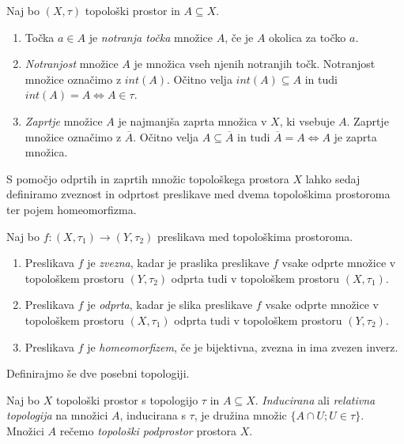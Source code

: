 \documentclass[mat1]{fmfdelo}
\newcommand{\closure}[1]{\overline{#1}}
\begin{document}
\begin{definicija}\label{def:notranjost}
Naj bo $(X, \tau)$ topološki prostor in $A \subseteq X$.
\begin{enumerate}
\item Točka $a \in A$ je \emph{notranja točka} množice $A$, če je $A$ okolica za točko $a$.
\item \emph{Notranjost} množice $A$ je množica vseh njenih notranjih točk. Notranjost množice označimo z $int(A)$. Očitno velja $int(A) \subseteq A$ in tudi $int(A) = A \iff A \in \tau$.
\item \emph{Zaprtje} množice $A$ je najmanjša zaprta množica v $X$, ki vsebuje $A$. Zaprtje množice označimo z $\closure{A}$. Očitno velja $A \subseteq \closure{A}$ in tudi $\closure{A} = A \iff A$ je zaprta množica.
\end{enumerate}
\end{definicija}

S pomočjo odprtih in zaprtih množic topološkega prostora $X$ lahko sedaj definiramo zveznost in odprtost preslikave med dvema topološkima prostoroma ter pojem homeomorfizma.

\begin{definicija}\label{def:toppreslikave}
Naj bo $f: (X, \tau_1) \to (Y, \tau_2)$ preslikava med topološkima prostoroma.
\begin{enumerate}
\item Preslikava $f$ je \emph{zvezna}, kadar je praslika preslikave $f$ vsake odprte množice v topološkem prostoru $(Y, \tau_2)$ odprta tudi v topološkem prostoru $(X, \tau_1)$.
\item Preslikava $f$ je \emph{odprta}, kadar je slika preslikave $f$ vsake odprte množice v topološkem prostoru $(X, \tau_1)$ odprta tudi v topološkem prostoru $(Y, \tau_2)$.
\item Preslikava $f$ je \emph{homeomorfizem}, če je bijektivna, zvezna in ima zvezen inverz.
\end{enumerate}
\end{definicija}

Definirajmo še dve posebni topologiji.

\begin{definicija}
Naj bo $X$ topološki prostor s topologijo $\tau$ in $A \subseteq X$. \emph{Inducirana} ali \emph{relativna topologija} na množici $A$, inducirana s $\tau$, je družina množic $\lbrace A \cap U ; U \in \tau \rbrace$. Množici $A$ rečemo \emph{topološki podprostor} prostora $X$.
\end{definicija}
\end{document}
